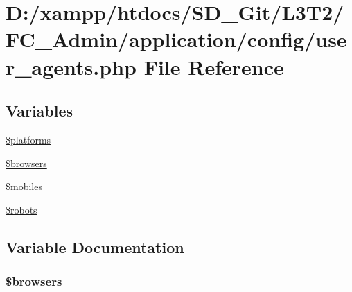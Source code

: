 \hypertarget{_admin_2application_2config_2user__agents_8php}{}\section{D\+:/xampp/htdocs/\+S\+D\+\_\+\+Git/\+L3\+T2/\+F\+C\+\_\+\+Admin/application/config/user\+\_\+agents.php File Reference}
\label{_admin_2application_2config_2user__agents_8php}
\subsection*{Variables}
\begin{DoxyCompactItemize}
\item 
\hyperlink{_admin_2application_2config_2user__agents_8php_a1c1a0a860242698ee6b3f4ef7d6eb343}{\$platforms}
\item 
\hyperlink{_admin_2application_2config_2user__agents_8php_a81edf933083b5ac5b380385f59074a7d}{\$browsers}
\item 
\hyperlink{_admin_2application_2config_2user__agents_8php_a6928dde5aa0be443766d5b2376de908a}{\$mobiles}
\item 
\hyperlink{_admin_2application_2config_2user__agents_8php_a5752e2a66d1c03bc34666492746037ab}{\$robots}
\end{DoxyCompactItemize}


\subsection{Variable Documentation}
\hypertarget{_admin_2application_2config_2user__agents_8php_a81edf933083b5ac5b380385f59074a7d}{}
\subsubsection[{\$browsers}]{\setlength{\rightskip}{0pt plus 5cm}\$browsers}\label{_admin_2application_2config_2user__agents_8php_a81edf933083b5ac5b380385f59074a7d}
\hypertarget{_admin_2application_2config_2user__agents_8php_a6928dde5aa0be443766d5b2376de908a}{}
